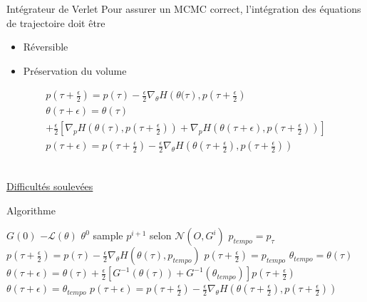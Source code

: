 \documentclass{beamer}
\begin{document}
  \begin{frame}{Intégrateur de Verlet}
	Pour assurer un MCMC correct, l'intégration des équations de trajectoire doit être	
	\begin{itemize}
	\item Réversible
	\item Préservation du volume
	\end{itemize}
	
	\begin{align*}
p\left(\tau +\frac{\epsilon}{2}\right)=p\left(\tau\right)-\frac{\epsilon}{2}\nabla_\theta H\left(\theta(\tau\right),p\left(\tau +\frac{\epsilon}{2}\right) \\
\theta(\tau +\epsilon)=\theta(\tau)\\
+\frac{\epsilon}{2}\left[	\nabla_p H\left(\theta\left(\tau\right),p\left(\tau+\frac{\epsilon}{2}\right)\right)+ \nabla_p H\left(\theta\left(\tau+\epsilon\right), p\left(\tau+\frac{\epsilon}{2}\right)\right)\right]\\
p(\tau+\epsilon)=p\left(\tau+\frac{\epsilon}{2}\right)-\frac{\epsilon}{2}\nabla_\theta H\left(\theta\left(\tau+\frac{\epsilon}{2}\right),p\left(\tau+\frac{\epsilon}{2}\right)\right)
	\end{align*}
	
	\begin{align*}
	\end{align*}
	
	\underline{Difficultés soulevées}
  \end{frame}	  
      
  
  \begin{frame}{Algorithme}
  

\begin{algorithmic}
\REQUIRE $G(0)$ $-\mathcal{L}(\theta)$ $\theta^0$
{}
\STATE sample $p^{i+1}$ selon $\mathcal{N}(O,G^i)$
\STATE $p_{tempo}=p_\tau$
\STATE $p\left(\tau +\frac{\epsilon}{2}\right)=p\left(\tau\right)-\frac{\epsilon}{2}\nabla_\theta H\left(\theta(\tau),p_{tempo}\right)$
\ENDFOR
\STATE $p\left(\tau +\frac{\epsilon}{2}\right) =p_{tempo}$
\STATE $\theta_{tempo}=\theta(\tau)$
\STATE $\theta(\tau +\epsilon)=\theta(\tau)+\frac{\epsilon}{2}\left[G^{-1}\left(\theta(\tau)\right)+G^{-1}\left(\theta_{tempo}\right)\right]p\left(\tau+\frac{\epsilon}{2}\right)$
\ENDFOR
\STATE $\theta(\tau+\epsilon)=\theta_{tempo}$
\STATE $p(\tau+\epsilon)=p\left(\tau+\frac{\epsilon}{2}\right)-\frac{\epsilon}{2}\nabla_\theta H\left(\theta\left(\tau+\frac{\epsilon}{2}\right),p\left(\tau+\frac{\epsilon}{2}\right)\right)$
\ENDFOR
\ENDFOR
\end{algorithmic}

  \end{frame}
  
\end{document}
